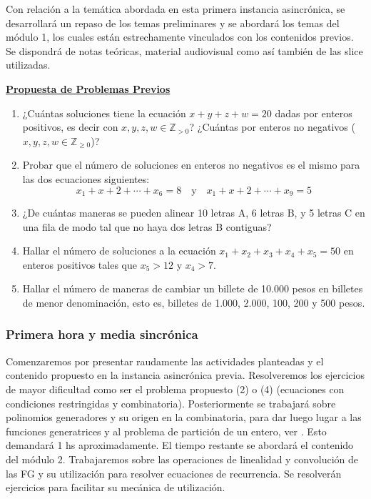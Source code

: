 Con relación a la temática abordada en esta primera instancia asincrónica, se desarrollará un repaso de los temas preliminares y se abordará los temas del módulo 1, los cuales están estrechamente vinculados con los contenidos previos. Se dispondrá de notas teóricas, material audiovisual como así también de las slice utilizadas.

\bigskip
\begin{center}
	\begin{minipage}{0.8\linewidth}
		\begin{center}
			\underline{\textbf{Propuesta de Problemas Previos}}
		\end{center}
		
		\begin{enumerate}
			\item ¿Cuántas soluciones tiene la ecuación $x + y + z + w = 20$ dadas por enteros positivos, es decir con $x, y, z, w \in \mathbb{Z}_{> 0}$? ¿Cuántas por enteros no negativos ($x, y, z, w \in \mathbb{Z}_{\ge 0}$)?
			\item Probar que el número de soluciones en enteros no negativos es el mismo para las dos ecuaciones siguientes: $$x_1 + x + 2 + \cdots + x_6 = 8 \quad \text{y} \quad x_1 + x + 2 + \cdots + x_9 = 5$$
			\item ¿De cuántas maneras se pueden alinear 10 letras A, 6 letras B, y 5 letras C en una fila de modo tal que no haya dos letras B contiguas? 
			\item Hallar el número de soluciones a la ecuación $x_1 + x_2 + x_3 + x_4 + x_5 = 50$ en enteros positivos tales que $x_5 > 12$ y $x_4 > 7$.
			\item Hallar el número de maneras de cambiar un billete de 10.000 pesos en billetes de menor denominación, esto es, billetes de 1.000, 2.000, 100, 200 y 500 pesos.
		\end{enumerate}
	\end{minipage}
\end{center}
\bigskip

\subsubsection{Primera hora y media sincrónica}

Comenzaremos por presentar raudamente las actividades planteadas y el contenido propuesto en la instancia asincrónica previa. Resolveremos los ejercicios de mayor dificultad como ser el problema propuesto (2) o (4) (ecuaciones con condiciones restringidas y combinatoria). Posteriormente se trabajará sobre polinomios generadores y su origen en la combinatoria, para dar luego lugar a las funciones generatrices y al problema de partición de un entero, ver \textcite{niven1995}. Esto demandará 1 hs aproximadamente. El tiempo restante se abordará el contenido del módulo 2. Trabajaremos sobre las operaciones de linealidad y convolución de las FG y su utilización para resolver ecuaciones de recurrencia. Se resolverán ejercicios para facilitar su mecánica de utilización.

